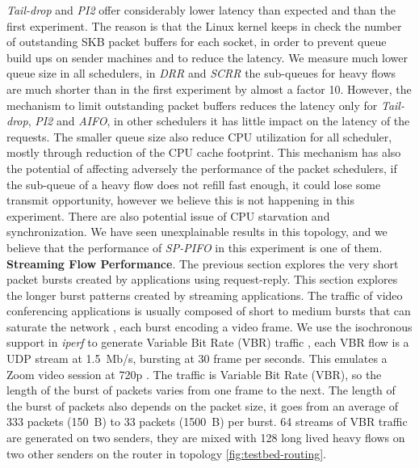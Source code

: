 \textit{Tail-drop} and \textit{PI2} offer considerably lower latency
than expected and than the first experiment. The reason is that the
Linux kernel keeps in check the number of outstanding SKB packet
buffers for each socket, in order to prevent queue build ups on sender
machines and to reduce the latency. We measure much lower queue size
in all schedulers, in \textit{DRR} and \textit{SCRR} the sub-queues
for heavy flows are much shorter than in the first experiment by
almost a factor 10. However, the mechanism to limit outstanding packet
buffers reduces the latency only for \textit{Tail-drop}, \textit{PI2}
and \textit{AIFO}, in other schedulers it has little impact on the
latency of the requests. The smaller queue size also reduce CPU
utilization for all scheduler, mostly through reduction of the CPU
cache footprint. This mechanism has also the potential of affecting
adversely the performance of the packet schedulers, if the sub-queue
of a heavy flow does not refill fast enough, it could lose some
transmit opportunity, however we believe this is not happening in this
experiment. There are also potential issue of CPU starvation and
synchronization. We have seen unexplainable results in this topology,
and we believe that the performance of \textit{SP-PIFO} in this
experiment is one of them.
\\
\textbf{Streaming Flow Performance}.
The previous section explores the very short packet bursts created by
applications using request-reply. This
section explores the longer burst patterns created by streaming
applications. The traffic of video conferencing applications is
usually composed of short to medium bursts that can saturate the network
\cite{webrtc-teams}, each burst encoding a video frame. We use the
isochronous support in \textit{iperf} to generate Variable Bit Rate (VBR)
traffic \cite{iperf2}, each VBR flow is a UDP stream at 1.5~Mb/s,
bursting at 30 frame per seconds. This emulates a Zoom video session
at 720p \cite{passive,
  zoom}. The traffic is Variable Bit Rate (VBR), so the length of the
burst of packets varies from one frame to the next. The length of the
burst of packets also depends on the packet size, it goes from an
average of 333 packets (150~B) to 33 packets (1500~B) per burst. 64
streams of VBR traffic are generated on two senders, they are mixed
with 128 long lived heavy flows on two other senders on the router in
topology \ref{fig:testbed-routing}.

